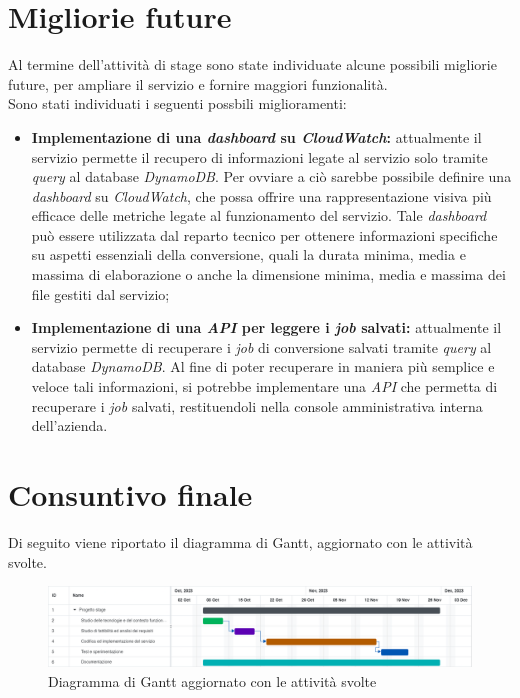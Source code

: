 \section{Migliorie future}
Al termine dell'attività di stage sono state individuate alcune possibili
migliorie future, per ampliare il servizio e fornire maggiori funzionalità. \\
Sono stati individuati i seguenti possbili miglioramenti:
\begin{itemize}
    \item \textbf{Implementazione di una \emph{dashboard} su \emph{CloudWatch}:}
          attualmente il servizio permette il recupero di informazioni legate al
          servizio solo tramite \emph{query} al database \emph{DynamoDB}. Per ovviare
          a ciò sarebbe possibile definire una \emph{dashboard} su \emph{CloudWatch},
          che possa offrire una rappresentazione visiva più efficace delle metriche legate al
          funzionamento del servizio. Tale \emph{dashboard} può essere utilizzata dal
          reparto tecnico per ottenere informazioni specifiche su aspetti essenziali
          della conversione, quali la durata minima, media e massima di elaborazione o
          anche la dimensione minima, media e massima dei file gestiti dal servizio;
    \item \textbf{Implementazione di una \emph{API} per leggere i \emph{job}
              salvati:} attualmente il servizio permette di recuperare i \emph{job} di
          conversione salvati tramite \emph{query} al database \emph{DynamoDB}. Al
          fine di poter recuperare in maniera più semplice e veloce tali informazioni,
          si potrebbe implementare una \emph{API} che permetta di recuperare i
          \emph{job} salvati, restituendoli nella console amministrativa interna dell'azienda.
\end{itemize}

\section{Consuntivo finale}

Di seguito viene riportato il diagramma di Gantt, aggiornato con le attività
svolte.

\begin{figure}[H]
    \centering
    \includegraphics[width=\textwidth]{images/gantt.png}
    \caption{Diagramma di Gantt aggiornato con le attività svolte}
    \label{fig:gantt-finale}
\end{figure}

